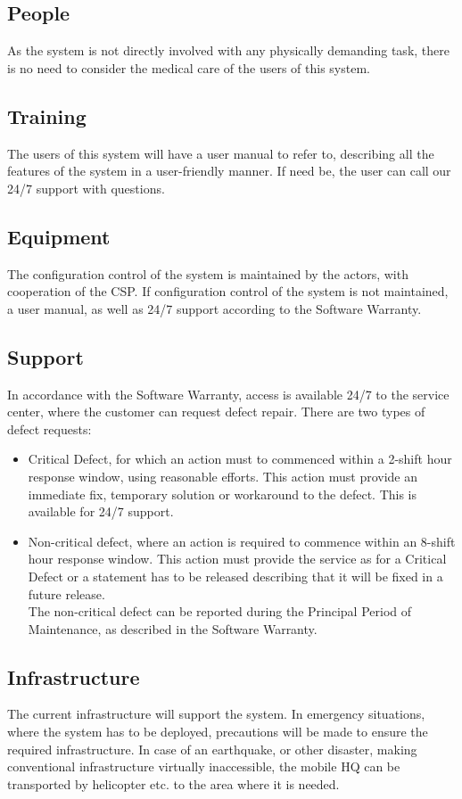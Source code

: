 \subsection{People}
As the system is not directly involved with any physically demanding task, there is no need to consider the medical care of the users of this system.

\subsection{Training}
The users of this system will have a user manual to refer to, describing all the features of the system in a user-friendly manner. If need be, the user can call our 24/7 support with questions.

\subsection{Equipment}
The configuration control of the system is maintained by the actors, with cooperation of the CSP. If configuration control of the system is not maintained, a user manual, as well as 24/7 support according to the Software Warranty. 

\subsection{Support}
In accordance with the Software Warranty, access is available 24/7 to the service center, where the customer can request defect repair. There are two types of defect requests:
\begin{itemize}
	\itemsep0em
	\item Critical Defect, for which an action must to commenced within a 2-shift hour response window, using reasonable efforts. This action must provide an immediate fix, temporary solution or workaround to the defect. This is available for 24/7 support.
	\item Non-critical defect, where an action is required to commence within an 8-shift hour response window. This action must provide the service as for a Critical Defect or a statement has to be released describing that it will be fixed in a future release. \\
	The non-critical defect can be reported during the Principal Period of Maintenance, as described in the Software Warranty.
\end{itemize}

\subsection{Infrastructure}
The current infrastructure will support the system. In emergency situations, where the system has to be deployed, precautions will be made to ensure the required infrastructure.
In case of an earthquake, or other disaster, making conventional infrastructure virtually inaccessible, the mobile HQ can be transported by helicopter etc. to the area where it is needed.

